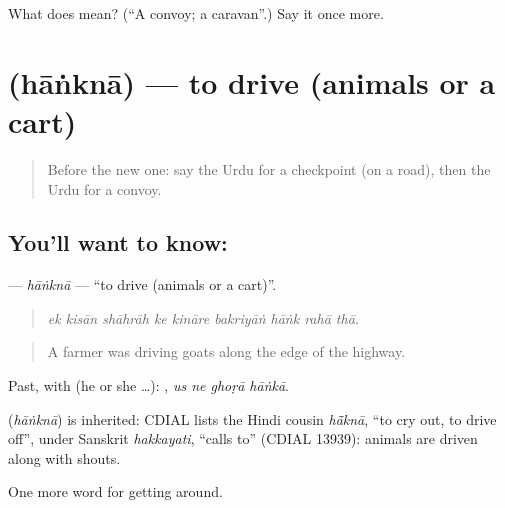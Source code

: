 \begin{tcolorbox}[breakable,colback=teal!4,colframe=teal!35!black,title={Before you move on}]
What does  mean? (\textquotedblleft{}A convoy; a caravan\textquotedblright{}.) Say it once more.
\end{tcolorbox}
\section[\texorpdfstring{\ur{ہانکنا} (hāṅknā)}{ہانکنا (hāṅknā)}]{ (hāṅknā) — to drive (animals or a cart)}

\label{lesson:UR-C396-hankna}



\begin{quote}
Before the new one: say the Urdu for a checkpoint (on a road), then the Urdu for a convoy.
\end{quote}

\subsection*{You'll want to know: }
\textbf{} — \emph{hāṅknā} — \textquotedblleft{}to drive (animals or a cart)\textquotedblright{}.

\begin{quote}
        
\end{quote}

\begin{quote}
\emph{ek kisān shāhrāh ke kināre bakriyāṅ hāṅk rahā thā.}
\end{quote}

\begin{quote}
A farmer was driving goats along the edge of the highway.
\end{quote}

Past, with  (he or she …):    , \emph{us ne ghoṛā hāṅkā}.

\begin{cousinweb}
\textbf{} (\emph{hāṅknā}) is inherited: CDIAL lists the Hindi cousin \emph{hā̃knā}, \textquotedblleft{}to cry out, to drive off\textquotedblright{}, under Sanskrit \emph{hakkayati}, \textquotedblleft{}calls to\textquotedblright{} (CDIAL 13939): animals are driven along with shouts.
\end{cousinweb}

\begin{grammarlens}[title={What you've built}]
One more word for getting around.
\end{grammarlens}

